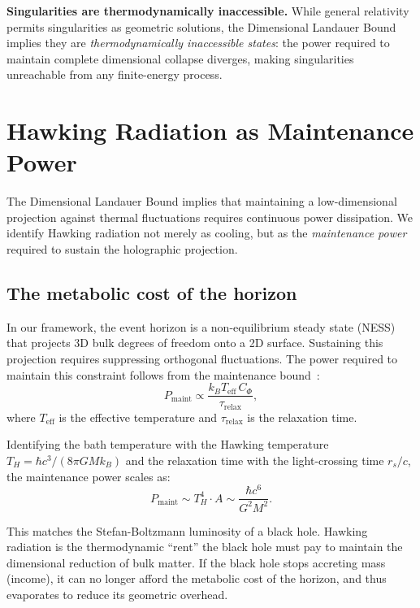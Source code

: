 \documentclass[aps,prd,twocolumn,superscriptaddress,floatfix]{revtex4-2}
\begin{document}
\textbf{Singularities are thermodynamically inaccessible.} While general relativity permits singularities as geometric solutions, the Dimensional Landauer Bound implies they are \emph{thermodynamically inaccessible states}: the power required to maintain complete dimensional collapse diverges, making singularities unreachable from any finite-energy process.

\section{Hawking Radiation as Maintenance Power}

The Dimensional Landauer Bound implies that maintaining a low-dimensional projection against thermal fluctuations requires continuous power dissipation. We identify Hawking radiation not merely as cooling, but as the \emph{maintenance power} required to sustain the holographic projection.

\subsection{The metabolic cost of the horizon}

In our framework, the event horizon is a non-equilibrium steady state (NESS) that projects 3D bulk degrees of freedom onto a 2D surface. Sustaining this projection requires suppressing orthogonal fluctuations. The power required to maintain this constraint follows from the maintenance bound~\cite{todd2025landauer}:
\begin{equation}
P_{\mathrm{maint}} \propto \frac{k_B T_{\mathrm{eff}} \, C_\Phi}{\tau_{\mathrm{relax}}},
\end{equation}
where $T_{\mathrm{eff}}$ is the effective temperature and $\tau_{\mathrm{relax}}$ is the relaxation time.

Identifying the bath temperature with the Hawking temperature $T_H = \hbar c^3 / (8\pi G M k_B)$ and the relaxation time with the light-crossing time $r_s/c$, the maintenance power scales as:
\begin{equation}
P_{\mathrm{maint}} \sim T_H^4 \cdot A \sim \frac{\hbar c^6}{G^2 M^2}.
\end{equation}

This matches the Stefan-Boltzmann luminosity of a black hole. Hawking radiation is the thermodynamic ``rent'' the black hole must pay to maintain the dimensional reduction of bulk matter. If the black hole stops accreting mass (income), it can no longer afford the metabolic cost of the horizon, and thus evaporates to reduce its geometric overhead.
\end{document}
